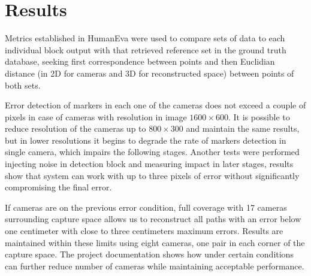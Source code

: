 \section{Results}

Metrics established in HumanEva \cite{humaneva} were used to compare sets of data to each individual block output with that retrieved reference set in the ground truth database, seeking first correspondence between points and then Euclidian distance (in 2D for cameras and 3D for 
reconstructed space) between points of both sets.

Error detection of markers in each one of the cameras does not exceed a couple of pixels in case of cameras with resolution in image $1600\times600$. It is possible to reduce resolution of the cameras up to $800\times300$ and maintain the same results, but in lower resolutions it begins to degrade the rate of markers detection in single camera, which impairs the following stages. Another tests were performed injecting noise in detection block and measuring impact in later stages, results show that system can work with up to three pixels of error without significantly compromising the final error.

If cameras are on the previous error condition, full coverage with 17 cameras surrounding capture space allows us to reconstruct all paths with an error below one centimeter with close to three centimeters maximum errors. Results are maintained within these limits using eight cameras, one pair in each corner of the capture space.
 The project documentation \cite{proyecto_biomecanica} shows how under certain conditions can further reduce number of cameras while maintaining acceptable performance.

